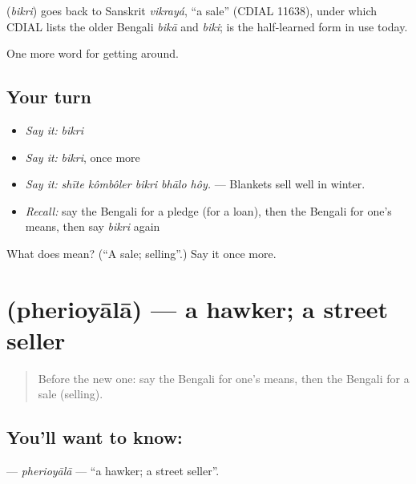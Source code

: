 \begin{cousinweb}
\textbf{} (\emph{bikri}) goes back to Sanskrit \emph{vikrayá}, \textquotedblleft{}a sale\textquotedblright{} (CDIAL 11638), under which CDIAL lists the older Bengali \emph{bikā} and \emph{biki};  is the half-learned form in use today.
\end{cousinweb}

\begin{grammarlens}[title={What you've built}]
One more word for getting around.
\end{grammarlens}

\subsection*{Your turn}
\begin{itemize}
\raggedright
  \item \emph{Say it:} \emph{bikri}
  \item \emph{Say it:} \emph{bikri}, once more
  \item \emph{Say it:} \emph{shīte kômbôler bikri bhālo hôy.} — Blankets sell well in winter.
  \item \emph{Recall:} say the Bengali for a pledge (for a loan), then the Bengali for one's means, then say \emph{bikri} again
\end{itemize}

\begin{tcolorbox}[breakable,colback=teal!4,colframe=teal!35!black,title={Before you move on}]
What does  mean? (\textquotedblleft{}A sale; selling\textquotedblright{}.) Say it once more.
\end{tcolorbox}
\section[\texorpdfstring{\bn{ফেরিওয়ালা} (pherioyālā)}{ফেরিওয়ালা (pherioyālā)}]{ (pherioyālā) — a hawker; a street seller}

\label{lesson:BN-C420-pherioyala}



\begin{quote}
Before the new one: say the Bengali for one's means, then the Bengali for a sale (selling).
\end{quote}

\subsection*{You'll want to know: }
\textbf{} — \emph{pherioyālā} — \textquotedblleft{}a hawker; a street seller\textquotedblright{}.

